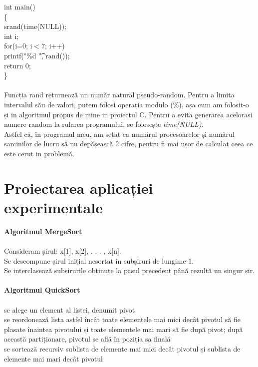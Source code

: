 \documentclass{article}
\begin{document}
int main() \\
\big\{ \\
srand(time(NULL)); \\
int i; \\
for(i=0; i$<$7; i++) \\
printf("\%d \t", rand()); \\
return 0; \\
\big\}
\\  
\\
Funcția rand returnează un număr natural pseudo-random. Pentru a limita intervalul său de valori, putem folosi operația modulo ($\%$), așa cum am folosit-o și in algoritmul propus de mine in proiectul C.  Pentru a evita generarea acelorasi numere random la rularea programului, se folosește \emph{time(NULL)}. \\
Astfel că, în programul meu, am setat ca numărul procesoarelor și numărul sarcinilor de lucru să nu depășească 2 cifre, pentru fi mai ușor de calculat ceea ce este cerut in problemă. \\

\newpage
\section{Proiectarea aplicației experimentale}
 \textbf{ Algoritmul MergeSort}  \\
  \\
\hspace{1cm} Consideram șirul: x[1], x[2], . . . , x[n].\\
 Se descompune șirul inițial nesortat în subșiruri de lungime 1. \\
 Se interclasează subșirurile obținute la pasul precedent până rezultă un singur șir. \\
\\
 \textbf{Algoritmul QuickSort} \\
 \\
  se alege un element al listei, denumit pivot \\
se reordonează lista astfel încât toate elementele mai mici decât pivotul să fie plasate înaintea pivotului și toate elementele mai mari să fie după pivot; după această partiționare, pivotul se află în poziția sa finală \\
 se sortează recursiv sublista de elemente mai mici decât pivotul și sublista de elemente mai mari decât pivotul \\

\newpage
\end{document}
